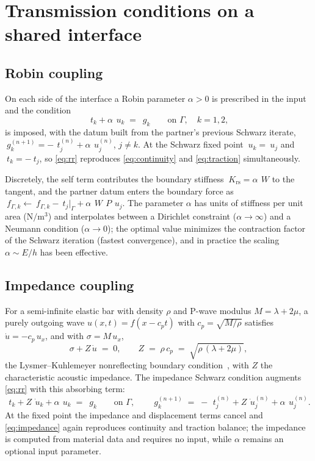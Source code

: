 \documentclass[11pt]{article}
\begin{document}
\section{Transmission conditions on a shared interface}
\label{sec:nonoverlap-tc}

\subsection{Robin coupling}
\label{sec:rr}

On each side of the interface a Robin parameter $\alpha > 0$ is
prescribed in the input and the condition
\begin{equation}
  ~t_k + \alpha\, ~u_k \;=\; ~g_k
    \qquad \text{on } \Gamma, \quad k = 1, 2,
  \label{eq:rr}
\end{equation}
is imposed, with the datum built from the partner's previous Schwarz
iterate,
$~g_k^{(n+1)} = -\,~t_j^{(n)} + \alpha\, ~u_j^{(n)}$, $j \ne k$. At the
Schwarz fixed point $~u_k = ~u_j$ and $~t_k = -~t_j$, so \eqref{eq:rr}
reproduces \eqref{eq:continuity} and \eqref{eq:traction} simultaneously.

Discretely, the self term contributes the boundary stiffness
$~K_{\mathrm{rs}} = \alpha\,~W$ to the tangent, and the partner datum enters
the boundary force as
$~f_{\Gamma,k} \leftarrow ~f_{\Gamma,k} - ~t_j\big|_\Gamma
 + \alpha\,~W\,~P\,~u_j$.
The parameter $\alpha$ has units of stiffness per unit area
($\mathrm{N}/\mathrm{m}^3$) and interpolates between a Dirichlet constraint
($\alpha \to \infty$) and a Neumann condition ($\alpha \to 0$); the optimal
value minimizes the contraction factor of the Schwarz iteration (fastest
convergence), and in practice the scaling $\alpha \sim E/h$ has been
effective.

\subsection{Impedance coupling}
\label{sec:imp}

For a semi-infinite elastic bar with density $\rho$ and P-wave modulus
$M = \lambda + 2\mu$, a purely outgoing wave $u(x,t) = f(x - c_p t)$ with
$c_p = \sqrt{M/\rho}$ satisfies $\dot u = -c_p\,u_x$, and with
$\sigma = M\,u_x$,
\begin{equation}
  \sigma + Z\,\dot u \;=\; 0,
  \qquad
  Z \;=\; \rho\,c_p \;=\; \sqrt{\rho\,(\lambda + 2\mu)},
  \label{eq:lk}
\end{equation}
the Lysmer--Kuhlemeyer nonreflecting boundary
condition~\cite{LysmerKuhlemeyer1969}, with $Z$ the characteristic acoustic
impedance. The impedance Schwarz condition augments
\eqref{eq:rr} with this absorbing term:
\begin{equation}
  ~t_k + Z\, \dot{~u}_k + \alpha\, ~u_k \;=\; ~g_k
  \qquad \text{on } \Gamma,
  \qquad
  ~g_k^{(n+1)} \;=\; -\,~t_j^{(n)} + Z\, \dot{~u}_j^{(n)}
     + \alpha\, ~u_j^{(n)}.
  \label{eq:impedance}
\end{equation}
At the fixed point the impedance and displacement terms cancel and
\eqref{eq:impedance} again reproduces continuity and traction balance; the
impedance is computed from material data and requires no input, while
$\alpha$ remains an optional input parameter.
\end{document}

